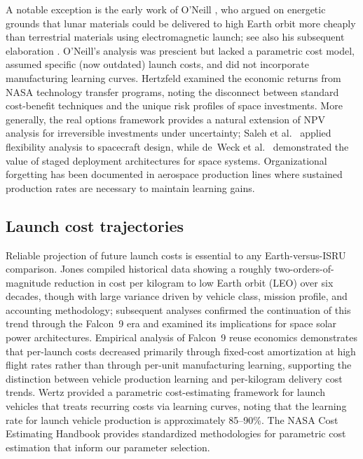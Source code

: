 \documentclass[preprint,12pt]{elsarticle}
\begin{document}
A notable exception is the early work of O'Neill \cite{oneill1974}, who argued on energetic grounds that lunar materials could be delivered to high Earth orbit more cheaply than terrestrial materials using electromagnetic launch; see also his subsequent elaboration \cite{oneill1976}. O'Neill's analysis was prescient but lacked a parametric cost model, assumed specific (now outdated) launch costs, and did not incorporate manufacturing learning curves. Hertzfeld \cite{hertzfeld2002} examined the economic returns from NASA technology transfer programs, noting the disconnect between standard cost-benefit techniques and the unique risk profiles of space investments. More generally, the real options framework \cite{dixit1994} provides a natural extension of NPV analysis for irreversible investments under uncertainty; Saleh et al.\ \cite{saleh2003} applied flexibility analysis to spacecraft design, while de~Weck et al.\ \cite{deweck2004} demonstrated the value of staged deployment architectures for space systems. Organizational forgetting \cite{benkard2000,thompson2012} has been documented in aerospace production lines where sustained production rates are necessary to maintain learning gains.

\subsection{Launch cost trajectories}

Reliable projection of future launch costs is essential to any Earth-versus-ISRU comparison. Jones \cite{jones2018} compiled historical data showing a roughly two-orders-of-magnitude reduction in cost per kilogram to low Earth orbit (LEO) over six decades, though with large variance driven by vehicle class, mission profile, and accounting methodology; subsequent analyses \cite{jones2020,jones2022} confirmed the continuation of this trend through the Falcon~9 era and examined its implications for space solar power architectures. Empirical analysis of Falcon~9 reuse economics \cite{zapata2019} demonstrates that per-launch costs decreased primarily through fixed-cost amortization at high flight rates rather than through per-unit manufacturing learning, supporting the distinction between vehicle production learning and per-kilogram delivery cost trends. Wertz \cite{wertz2011} provided a parametric cost-estimating framework for launch vehicles that treats recurring costs via learning curves, noting that the learning rate for launch vehicle production is approximately 85--90\%. The NASA Cost Estimating Handbook \cite{nasa2015handbook} provides standardized methodologies for parametric cost estimation that inform our parameter selection.
\end{document}
